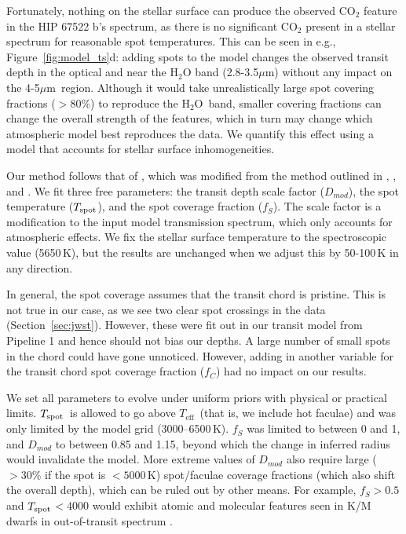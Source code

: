 \documentclass[twocolumn]{aastex63} %
\newcommand{\water}{H$_2$O}
\newcommand{\um}{$\mu$m}
\newcommand{\teff}{\ensuremath{T_{\text{eff}}}}
\newcommand{\tspot}{$T_{\rm{spot}}$}
\newcommand{\plname}{HIP 67522 b}
\begin{document}
Fortunately, nothing on the stellar surface can produce the observed CO$_2$ feature in the \plname's spectrum, as there is no significant CO$_2$ present in a stellar spectrum for reasonable spot temperatures. This can be seen in e.g., Figure~\ref{fig:model_ts}d: adding spots to the model changes the observed transit depth in the optical and near the H$_2$O band (2.8-3.5\um) without any impact on the 4-5\um\ region. Although it would take unrealistically large spot covering fractions ($>80\%$) to reproduce the \water\ band, smaller covering fractions can change the overall strength of the features, which in turn may change which atmospheric model best reproduces the data. We quantify this effect using a model that accounts for stellar surface inhomogeneities. 


Our method follows that of \citet{Thao2023}, which was modified from the method outlined in \citet{rackham2017access}, \citet{Thao2020}, and \citet{Libby-Roberts2022}. We fit three free parameters: the transit depth scale factor ($D_{mod}$), the spot temperature ($T_{\rm{spot}}$), and the spot coverage fraction ($f_S$). The scale factor is a modification to the input model transmission spectrum, which only accounts for atmospheric effects. We fix the stellar surface temperature to the spectroscopic value (5650\,K), but the results are unchanged when we adjust this by 50-100\,K in any direction. 

In general, the spot coverage assumes that the transit chord is pristine. This is not true in our case, as we see two clear spot crossings in the data (Section~\ref{sec:jwst}). However, these were fit out in our transit model from Pipeline 1 and hence should not bias our depths. A large number of small spots in the chord could have gone unnoticed. However, adding in another variable for the transit chord spot coverage fraction ($f_C$) had no impact on our results.

We set all parameters to evolve under uniform priors with physical or practical limits. \tspot\ is allowed to go above \teff\ (that is, we include hot faculae) and was only limited by the model grid (3000--6500\,K). $f_S$ was limited to between 0 and 1, and $D_{mod}$ to between 0.85 and 1.15, beyond which the change in inferred radius would invalidate the model. More extreme values of $D_{mod}$ also require large ($>30\%$ if the spot is $<5000$\,K) spot/faculae coverage fractions (which also shift the overall depth), which can be ruled out by other means. For example, $f_S>0.5$ and \tspot$<4000$ would exhibit atomic and molecular features seen in K/M dwarfs in out-of-transit spectrum \citep{Thao2023}.
\end{document}
